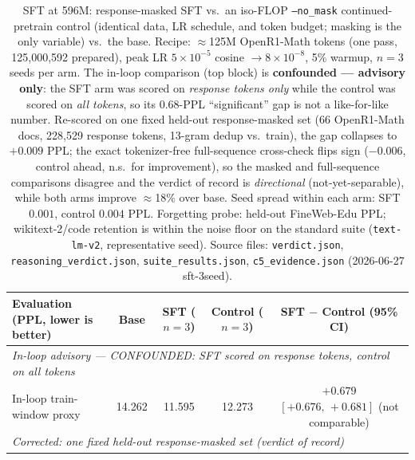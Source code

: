 \begin{table}[t]
\centering
\caption{SFT at 596M: response-masked SFT vs.\ an iso-FLOP \texttt{--no\_mask} continued-pretrain control (identical data, LR schedule, and token budget; masking is the only variable) vs.\ the base.
Recipe: $\approx$125M OpenR1-Math tokens (one pass, 125{,}000{,}592 prepared), peak LR $5\times10^{-5}$ cosine $\rightarrow 8\times10^{-8}$, 5\% warmup, $n{=}3$ seeds per arm.
The in-loop comparison (top block) is \textbf{confounded --- advisory only}: the SFT arm was scored on \emph{response tokens only} while the control was scored on \emph{all tokens}, so its 0.68-PPL ``significant'' gap is not a like-for-like number.
Re-scored on one fixed held-out response-masked set (66 OpenR1-Math docs, 228{,}529 response tokens, 13-gram dedup vs.\ train), the gap collapses to $+0.009$ PPL; the exact tokenizer-free full-sequence cross-check flips sign ($-0.006$, control ahead, n.s.\ for improvement), so the masked and full-sequence comparisons disagree and the verdict of record is \emph{directional} (not-yet-separable), while both arms improve $\approx$18\% over base.
Seed spread within each arm: SFT $0.001$, control $0.004$ PPL.
Forgetting probe: held-out FineWeb-Edu PPL; wikitext-2/code retention is within the noise floor on the standard suite (\texttt{text-lm-v2}, representative seed).
Source files: \texttt{verdict.json}, \texttt{reasoning\_verdict.json}, \texttt{suite\_results.json}, \texttt{c5\_evidence.json} (2026-06-27 sft-3seed).}
\label{tab:sft}
\footnotesize
\begin{tabular}{lcccc}
\toprule
Evaluation (PPL, lower is better) & Base & SFT ($n{=}3$) & Control ($n{=}3$) & SFT $-$ Control (95\% CI) \\
\midrule
\multicolumn{5}{l}{\emph{In-loop advisory --- CONFOUNDED: SFT scored on response tokens, control on all tokens}} \\
In-loop train-window proxy & 14.262 & 11.595 & 12.273 & $+0.679$ $[+0.676,\,+0.681]$ (not comparable) \\
\midrule
\multicolumn{5}{l}{\emph{Corrected: one fixed held-out response-masked set (verdict of record)}} \\

\end{tabular}
\end{table}
